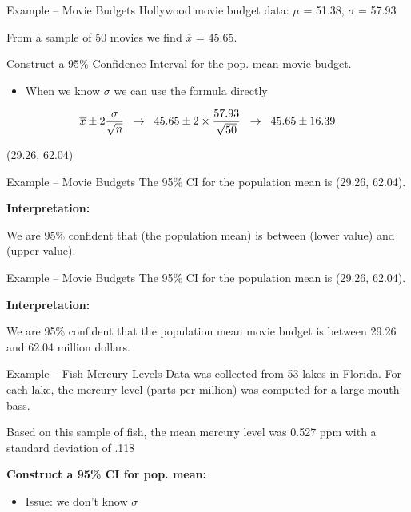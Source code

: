 \documentclass{beamer}
\begin{document}
\begin{frame}{Example -- Movie Budgets}
Hollywood movie budget data: $\mu$ = 51.38, $\sigma$ = 57.93 \vspace{2mm}

From a sample of 50 movies we find $\overline{x}$ = 45.65. \vspace{2mm} 

Construct a 95\% Confidence Interval for the pop. mean movie budget. 
\begin{itemize}
    \item When we know $\sigma$ we can use the formula directly
\end{itemize} \vspace{4mm}
\begin{align*}
    \overline{x} \pm 2\frac{\sigma}{\sqrt{n}} \hspace{2mm}\rightarrow \hspace{2mm} 45.65 \pm 2\times \frac{57.93}{\sqrt{50}} \hspace{2mm}\rightarrow \hspace{2mm} 45.65 \pm 16.39
\end{align*}
\begin{center}
    (29.26, 62.04)
\end{center}
\end{frame}

\begin{frame}{Example -- Movie Budgets}
The 95\% CI for the population mean is (29.26, 62.04). \vspace{8mm}

\textbf{Interpretation:}

We are 95\% confident that (the population mean) is between (lower value) and (upper value). 
\end{frame}

\begin{frame}{Example -- Movie Budgets}
The 95\% CI for the population mean is (29.26, 62.04). \vspace{8mm}

\textbf{Interpretation:}

We are 95\% confident that the population mean movie budget is between 29.26 and 62.04 million dollars.
\end{frame}

\begin{frame}{Example -- Fish Mercury Levels}
Data was collected from 53 lakes in Florida. For each lake, the mercury level (parts per million) was computed for a large mouth bass. \vspace{2mm}

Based on this sample of fish, the mean mercury level was 0.527 ppm with a standard deviation of .118 \vspace{2mm}

\textbf{Construct a 95\% CI for pop. mean:}
\begin{itemize}
    \item Issue: we don't know $\sigma$
\end{itemize}
\vspace{35mm}
\end{frame}
\end{document}
